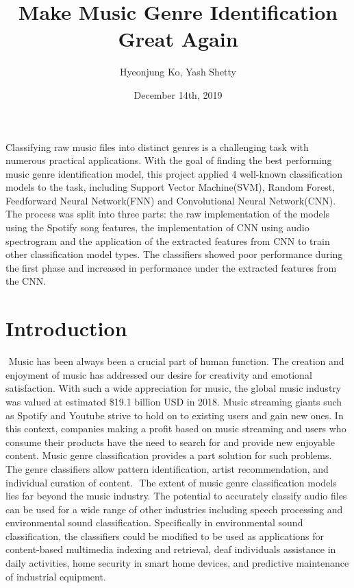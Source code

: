 \documentclass[11.5pt]{article}
\title{Make Music Genre Identification Great Again}
\author{Hyeonjung Ko, Yash Shetty}
\date{December 14th, 2019}
\begin{document}
\maketitle

\abstract
Classifying raw music files into distinct genres is a challenging task with numerous practical applications. With the goal of finding the best performing music genre identification model, this project applied 4 well-known classification models to the task, including Support Vector Machine(SVM), Random Forest, Feedforward Neural Network(FNN) and Convolutional Neural Network(CNN). The process was split into three parts: the raw implementation of the models using the Spotify song features, the implementation of CNN using audio spectrogram and the application of the extracted features from CNN to train other classification model types. The classifiers showed poor performance during the first phase and increased in performance under the extracted features from the CNN.\\
\vspace{2mm}
\section{Introduction}
​
Music has been always been a crucial part of human function. The creation and enjoyment of music has addressed our desire for creativity and emotional satisfaction. With such a wide appreciation for music, the global music industry was valued at estimated \$19.1 billion USD in 2018. Music streaming giants such as Spotify and Youtube strive to hold on to existing users and gain new ones. In this context, companies making a profit based on music streaming and users who consume their products have the need to search for and provide new enjoyable content. Music genre classification provides a part solution for such problems. The genre classifiers allow pattern identification, artist recommendation, and individual curation of content.
​
The extent of music genre classification models lies far beyond the music industry. The potential to accurately classify audio files can be used for a wide range of other industries including speech processing and environmental sound classification. Specifically in environmental sound classification, the classifiers could be modified to be used as applications for content-based multimedia indexing and retrieval, deaf individuals assistance in daily activities, home security in smart home devices, and predictive maintenance of industrial equipment. 
​
\end{document}
